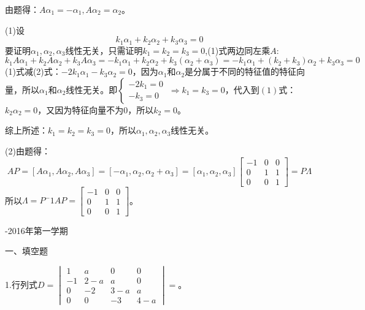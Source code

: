 \documentclass{article}
\begin{document}
\begin{jie}
由题得：$A\alpha_ {1}=-\alpha_ {1},A\alpha_{2}=\alpha_{2}$。

(1)设
\begin{equation*}
k_1\alpha_{1}+k_2\alpha_{2}+k_3\alpha_{3}=0\tag{$1$}
\end{equation*}
要证明$\alpha_{1},\alpha_{2},\alpha_{3}$线性无关，只需证明$k_1=k_2=k_3=0$,(1)式两边同左乘$A$:
\begin{equation*}
k_1A\alpha_{1}+k_2A\alpha_{2}+k_3A\alpha_{3}=-k_1\alpha_{1}+k_2\alpha_{2}+k_3(\alpha_{2}+\alpha_{3})=-k_1\alpha_{1}+(k_2+k_3)\alpha_{2}+k_3\alpha_{3}=0\tag{$2$}
\end{equation*}
(1)式减(2)式：$-2k_1\alpha_{1}-k_3\alpha_{2}=0$，因为$\alpha_1$和$\alpha_2$是分属于不同的特征值的特征向量，所以$\alpha_1$和$\alpha_2$线性无关。即$
\begin{cases}
-2k_1=0\\
-k_3=0
\end{cases}~\Rightarrow k_1=k_3=0
$，代入到$(1)$式：$k_2\alpha_{2}=0$，又因为特征向量不为0，所以$k_{2}=0$。

综上所述：$k_{1}=k_2=k_3=0$，所以$\alpha_{1},\alpha_{2},\alpha_{3}$线性无关。

(2)由题得：
\begin{equation*}
AP=[A\alpha_1,A\alpha_2,A\alpha_3]=[-\alpha_1,\alpha_2,\alpha_2+\alpha_3]=[\alpha_1,\alpha_2,\alpha_3]
\begin{bmatrix}
  -1 & 0 & 0 \\
  0 & 1 & 1\\
  0 & 0 & 1
\end{bmatrix}=P\Lambda
\end{equation*}
所以$\Lambda=P^-1AP=
\begin{bmatrix}
  -1 & 0 & 0 \\
  0 & 1 & 1\\
  0 & 0 & 1
\end{bmatrix}
$。
\end{jie}
\newpage

\hphantom{~~}\hfill {-2016年第一学期} \hfill\hphantom{~~}

一、填空题

1.行列式$
D=
\begin{vmatrix}
  1 & a & 0 & 0\\
  -1 & 2-a & a & 0\\
  0 & -2 & 3-a & a\\
  0 & 0 & -3 & 4-a
\end{vmatrix}=
$\underline{\hphantom{~~~~~~~~~~}}。
\end{document}
